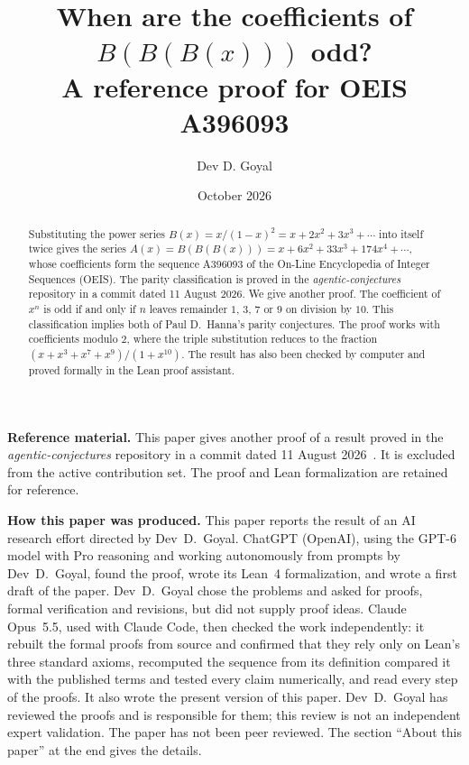 \documentclass[11pt,a4paper]{article}
\title{When are the coefficients of $B(B(B(x)))$ odd?\\[6pt]\large A reference proof for OEIS A396093}
\author{Dev D. Goyal}
\date{October 2026}
\theoremstyle{definition}
\theoremstyle{remark}
\begin{document}
\maketitle
\noindent\textbf{Reference material.} This paper gives another proof of a result proved in the
\emph{agentic-conjectures} repository in a commit dated 11 August 2026~\cite{prior}.
It is excluded from the active contribution set. The proof and Lean formalization are retained for reference.
\begin{abstract}
Substituting the power series $B(x)=x/(1-x)^2=x+2x^2+3x^3+\cdots$ into itself twice gives the series
$A(x)=B(B(B(x)))=x+6x^2+33x^3+174x^4+\cdots$, whose coefficients form the sequence A396093 of the On-Line Encyclopedia
of Integer Sequences (OEIS). The parity classification is proved in the \emph{agentic-conjectures} repository in a commit dated 11 August 2026.
We give another proof. The coefficient of $x^n$ is odd if and only if $n$ leaves remainder $1$, $3$, $7$ or $9$ on division by $10$.
This classification implies both of Paul D.~Hanna's parity conjectures.
The proof works with coefficients modulo $2$, where the triple substitution reduces to the fraction
$(x+x^3+x^7+x^9)/(1+x^{10})$. The result has also been checked by computer and proved formally in the Lean proof
assistant.
\end{abstract}
\begin{center}\begin{minipage}{0.88\linewidth}\small
\textbf{How this paper was produced.} This paper reports the result of an AI research effort directed by
Dev~D.~Goyal. ChatGPT (OpenAI), using the GPT-6 model with Pro reasoning and working autonomously from prompts by
Dev~D.~Goyal, found the proof, wrote its Lean~4 formalization, and wrote a first draft of the paper.
Dev~D.~Goyal chose the problems and asked for proofs, formal verification and revisions, but did not supply proof
ideas. Claude Opus~5.5, used with Claude Code, then checked the work independently: it rebuilt the formal proofs from
source and confirmed that they rely only on Lean's three standard axioms, recomputed the sequence from its definition
compared it with the published terms and tested every claim numerically, and read every step of the proofs. It also wrote the present
version of this paper.
Dev~D.~Goyal has reviewed the proofs and is responsible for them; this review is not an independent expert validation.
The paper has not been peer reviewed.
The section ``About this paper'' at the end gives the details.
\end{minipage}\end{center}
\end{document}
